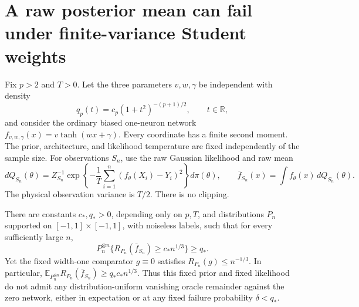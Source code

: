\section{A raw posterior mean can fail under finite-variance Student weights}

Fix $p>2$ and $T>0$. Let the three parameters $v,w,\gamma$ be
independent with density
\[
 q_p(t)=c_p(1+t^2)^{-(p+1)/2},\qquad t\in\mathbb R,
\]
and consider the ordinary biased one-neuron network
$f_{v,w,\gamma}(x)=v\tanh(wx+\gamma)$.
Every coordinate has a finite second moment. The prior, architecture,
and likelihood temperature are fixed independently of the sample size.
For observations $S_n$, use the raw Gaussian likelihood and raw mean
\[
 dQ_{S_n}(\theta)=Z_{S_n}^{-1}
  \exp\left\{-\frac1T\sum_{i=1}^n(f_\theta(X_i)-Y_i)^2\right\}
  d\pi(\theta),\qquad
 \bar f_{S_n}(x)=\int f_\theta(x)\,dQ_{S_n}(\theta).
\]
The physical observation variance is $T/2$. There is no clipping.

\begin{theorem}
There are constants $c_*,q_*>0$, depending only on $p,T$, and
distributions $P_n$ supported on $[-1,1]\times[-1,1]$, with noiseless
labels, such that for every sufficiently large $n$,
\[
 P_n^{\otimes n}\{R_{P_n}(\bar f_{S_n})\ge c_*n^{1/3}\}\ge q_*.
\]
Yet the fixed width-one comparator $g\equiv0$ satisfies
$R_{P_n}(g)\le n^{-1/3}$. In particular,
$\mathbb E_{P_n^{\otimes n}}R_{P_n}(\bar f_{S_n})\ge q_*c_*n^{1/3}$.
Thus this fixed prior and fixed likelihood do not admit any
distribution-uniform vanishing oracle remainder against the zero
network, either in expectation or at any fixed failure probability
$\delta<q_*$.
\end{theorem}

